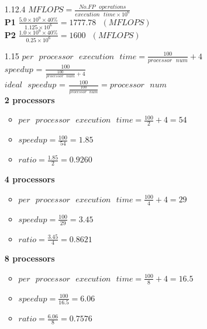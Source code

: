 \documentclass[12pt, a4paper]{article}
\begin{document}
\begin{itemize}[font=\bfseries]
\item[1.12.4]
$MFLOPS = \frac{No.FP\mbox{ }operations}{execution\mbox{ }time \times 10^6}$ \\
{\bf P1} \hspace{0.2cm} $\frac{5.0 \times 10^9 \times 40\%}{1.125 \times 10^6} = 1777.78\mbox{ }(MFLOPS)$ \\
{\bf P2} \hspace{0.2cm} $\frac{1.0 \times 10^9 \times 40\%}{0.25 \times 10^6} = 1600\mbox{ }(MFLOPS)$ \\

\item[1.15]
$per\mbox{ }processor\mbox{ }execution\mbox{ }time = \frac{100}{processor\mbox{ }num} + 4$ \\
$speedup$ = $\frac{100}{\frac{100}{processor\mbox{ }num} + 4}$ \\
$ideal\mbox{ }speedup$ = $\frac{100}{\frac{100}{processor\mbox{ }num}} = processor\mbox{ }num$ \\

{\bf 2 processors}
\begin{itemize}
\item $per\mbox{ }processor\mbox{ }execution\mbox{ }time = \frac{100}{2} + 4 = 54$ \\
\item $speedup = \frac{100}{54} = 1.85$ \\
\item $ratio = \frac{1.85}{2} = 0.9260$ \\
\end{itemize}

{\bf 4 processors}
\begin{itemize}
\item $per\mbox{ }processor\mbox{ }execution\mbox{ }time = \frac{100}{4} + 4 = 29$ \\
\item $speedup = \frac{100}{29} = 3.45$ \\
\item $ratio = \frac{3.45}{4} = 0.8621$ \\
\end{itemize}

{\bf 8 processors}
\begin{itemize}
\item $per\mbox{ }processor\mbox{ }execution\mbox{ }time = \frac{100}{8} + 4 = 16.5$ \\
\item $speedup = \frac{100}{16.5} = 6.06$ \\
\item $ratio = \frac{6.06}{8} = 0.7576$ \\
\end{itemize}


\end{itemize}
\end{document}
